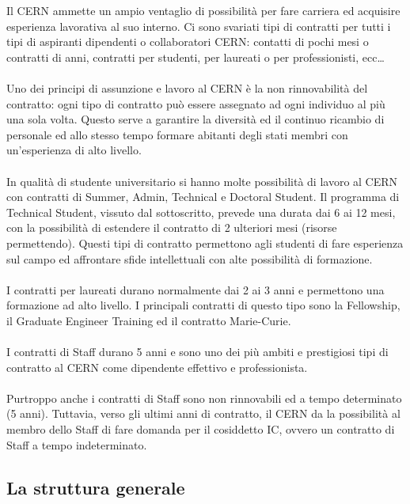 			Il \ac{CERN} ammette un ampio ventaglio di possibilità per fare carriera ed acquisire esperienza lavorativa al suo interno. Ci sono svariati tipi di contratti per tutti i tipi di aspiranti dipendenti o collaboratori \ac{CERN}: contatti di pochi mesi o contratti di anni, contratti per studenti, per laureati o per professionisti, ecc\dots \cite{cern:carreer}\\
			\\
			Uno dei principi di assunzione e lavoro al \ac{CERN} è la non rinnovabilità del contratto: ogni tipo di contratto può essere assegnato ad ogni individuo al più una sola volta. Questo serve a garantire la diversità ed il continuo ricambio di personale ed allo stesso tempo formare abitanti degli stati membri con un'esperienza di alto livello.\\
			\\
			In qualità di studente universitario si hanno molte possibilità di lavoro al \ac{CERN} con contratti di Summer, Admin, Technical e Doctoral Student. Il programma di Technical Student, vissuto dal sottoscritto, prevede una durata dai 6 ai 12 mesi, con la possibilità di estendere il contratto di 2 ulteriori mesi (risorse permettendo). Questi tipi di contratto permettono agli studenti di fare esperienza sul campo ed affrontare sfide intellettuali con alte possibilità di formazione.\\
			\\
			I contratti per laureati durano normalmente dai 2 ai 3 anni e permettono una formazione ad alto livello. I principali contratti di questo tipo sono la Fellowship, il Graduate Engineer Training ed il contratto Marie-Curie.\\
			\\
			I contratti di Staff durano 5 anni e sono uno dei più ambiti e prestigiosi tipi di contratto al \ac{CERN} come dipendente effettivo e professionista.\\
			\\
			Purtroppo anche i contratti di Staff sono non rinnovabili ed a tempo determinato (5 anni). Tuttavia, verso gli ultimi anni di contratto, il \ac{CERN} da la possibilità al membro dello Staff di fare domanda per il cosiddetto \ac{IC}, ovvero un contratto di Staff a tempo indeterminato.
	
		\subsection{La struttura generale} \label{subsec:CERN;lavoro;struttura}
		
